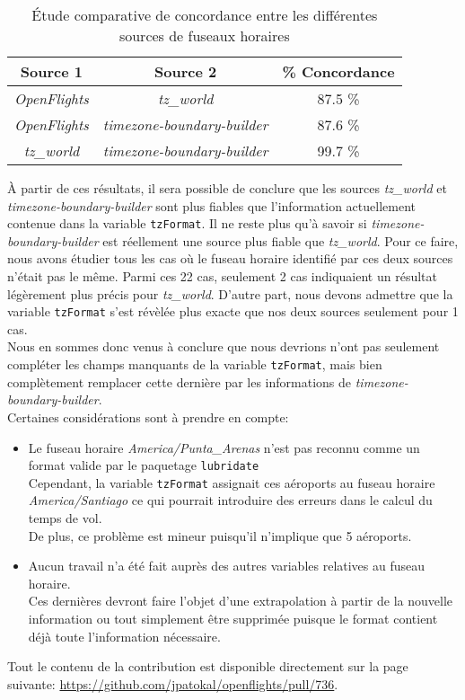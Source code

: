 \begin{table}
	\centering
	\begin{tabular}{ccc}
		\textbf{Source 1} & \textbf{Source 2} & \textbf{\% Concordance} \\
		\hline
		\emph{OpenFlights} & \emph{tz\_world} & 87.5 \% \\
		\emph{OpenFlights} & \emph{{timezone-boundary-builder}} & 87.6 \% \\
		\emph{tz\_world} & \emph{{timezone-boundary-builder}} & 99.7 \%	
	\end{tabular}
	\caption{Étude comparative de concordance entre les différentes sources de fuseaux horaires}
	\label{tab:tzConsistency}
\end{table}

À partir de ces résultats, il sera possible de conclure que les sources \emph{tz\_world} et \emph{{timezone-boundary-builder}} sont plus fiables que l'information actuellement contenue dans la variable \texttt{tzFormat}. Il ne reste plus qu'à savoir si \emph{{timezone-boundary-builder}} est réellement une source plus fiable que \emph{tz\_world}. Pour ce faire, nous avons étudier tous les cas où le fuseau horaire identifié par ces deux sources n'était pas le même. Parmi ces 22 cas, seulement 2 cas indiquaient un résultat légèrement plus précis pour \emph{tz\_world}. D'autre part, nous devons admettre que la variable \texttt{tzFormat} s'est révèlée plus exacte que nos deux sources seulement pour 1 cas. \\

Nous en sommes donc venus à conclure que nous devrions n'ont pas seulement compléter les champs manquants de la variable \texttt{tzFormat}, mais bien complètement remplacer cette dernière par les informations de \emph{{timezone-boundary-builder}}. \\

Certaines considérations sont à prendre en compte:
\begin{itemize}
	\item Le fuseau horaire \emph{{America/Punta\_Arenas}} n'est pas reconnu comme un format valide par le paquetage \texttt{lubridate} \\
	Cependant, la variable \texttt{tzFormat} assignait ces aéroports au fuseau horaire \emph{America/Santiago} ce qui pourrait introduire des erreurs dans le calcul du temps de vol. \cite{timeanddate} \\
	De plus, ce problème est mineur puisqu'il n'implique que 5 aéroports.
	\item Aucun travail n'a été fait auprès des autres variables relatives au fuseau horaire. \\
	Ces dernières devront faire l'objet d'une extrapolation à partir de la nouvelle information ou tout simplement être supprimée puisque le format contient déjà toute l'information nécessaire.
\end{itemize}
\vspace{\baselineskip}

Tout le contenu de la contribution est disponible directement sur la page suivante: \url{https://github.com/jpatokal/openflights/pull/736}. \\